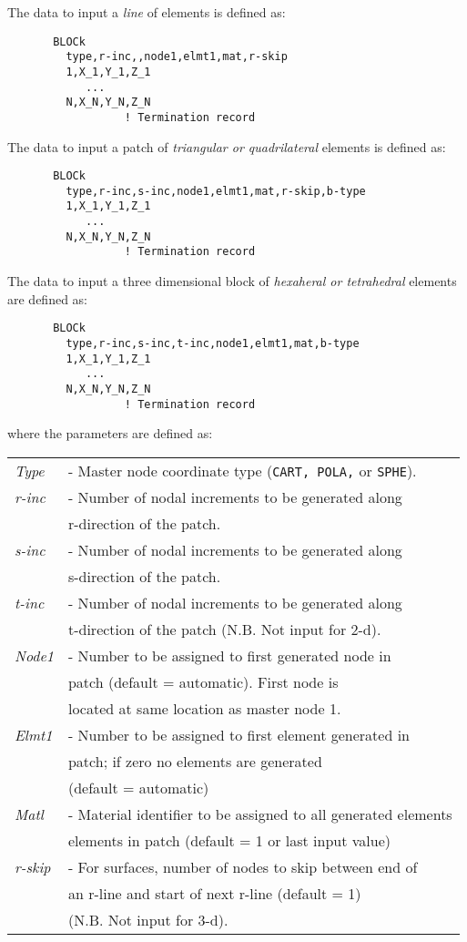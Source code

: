 The data to input a {\it line} of elements is defined as:
\begin{verbatim}
       BLOCk
         type,r-inc,,node1,elmt1,mat,r-skip
         1,X_1,Y_1,Z_1
            ...
         N,X_N,Y_N,Z_N
                  ! Termination record
\end{verbatim}
The data to input a patch of {\it triangular or quadrilateral}
elements is defined as:
\begin{verbatim}
       BLOCk
         type,r-inc,s-inc,node1,elmt1,mat,r-skip,b-type
         1,X_1,Y_1,Z_1
            ...
         N,X_N,Y_N,Z_N
                  ! Termination record
\end{verbatim}
The data to input a three dimensional block
of {\it hexaheral or tetrahedral} elements are defined as:
\begin{verbatim}
       BLOCk
         type,r-inc,s-inc,t-inc,node1,elmt1,mat,b-type
         1,X_1,Y_1,Z_1
            ...
         N,X_N,Y_N,Z_N
                  ! Termination record
\end{verbatim}
where the parameters are defined as:
\begin{center}
\begin{tabular}{l l}
\it Type  &- Master node coordinate type ({\tt CART, POLA,} or {\tt SPHE}). \\
\it r-inc &- Number of nodal increments to be generated along \\
          &\quad r-direction of the patch. \\
\it s-inc & - Number of nodal increments to be generated along \\
          &\quad s-direction of the patch. \\
\it t-inc &- Number of nodal increments to be generated along \\
          &\quad t-direction of the patch (N.B. Not input for 2-d). \\
\it Node1 &- Number to be assigned to first generated node in \\
          &\quad patch (default = automatic).  First node is \\
          &\quad located at same location as master node 1. \\
\it Elmt1 &- Number to be assigned to first element generated in \\
          &\quad patch; if zero no elements are generated \\
          &\quad (default = automatic) \\
\it Matl  &- Material identifier to be assigned to all generated elements \\
          &\quad elements in patch (default = 1 or last input value) \\
\it r-skip &- For surfaces, number of nodes to skip between end of \\
          &\quad an r-line and start of next r-line (default = 1) \\
          &\quad (N.B. Not input for 3-d). \\
\end{tabular}
\end{center}

